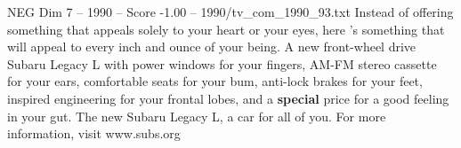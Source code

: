 \begin{textsample}{NEG Dim 7 – 1990 – Score -1.00 – 1990/tv\_com\_1990\_93.txt}  \label{ex:f7_neg_028}
Instead of offering something that appeals solely to your heart or your eyes, here 's something that will appeal to every inch and ounce of your being.
A new front-wheel drive Subaru Legacy L with power windows for your fingers, AM-FM stereo cassette for your ears, comfortable seats for your bum, anti-lock brakes for your feet, inspired engineering for your frontal lobes, and a \textbf{special} price for a good feeling in your gut.
The new Subaru Legacy L, a car for all of you.
For more information, visit www.subs.org

\end{textsample}
